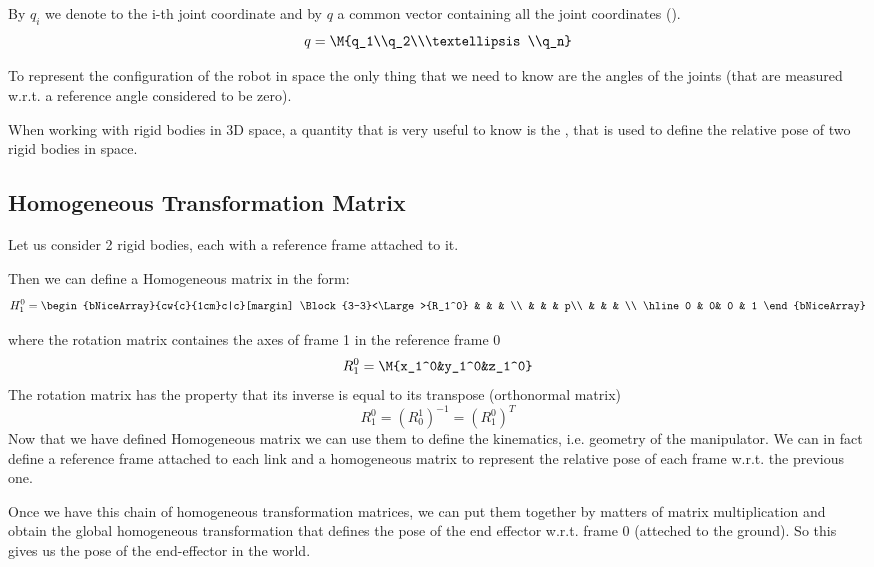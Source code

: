 By $q_i$ we denote to the i-th joint coordinate and by $q$ a common vector containing all the joint coordinates ().
\[
q = \M{q_1\\q_2\\\textellipsis\\q_n}
\]

To represent the configuration of the robot in space the only thing that we need to know are the angles of the joints (that are measured w.r.t. a reference angle considered to be zero).

When working with rigid bodies in 3D space, a quantity that is very useful to know is the , that is used to define the relative pose of two rigid bodies in space.

\subsection{Homogeneous Transformation Matrix}

Let us consider 2 rigid bodies, each with a reference frame attached to it.


Then we can define a Homogeneous matrix in the form:
\begin{equation*}
H_1^0 = 
\begin{bNiceArray}{cw{c}{1cm}c|c}[margin]
\Block{3-3}<\Large>{R_1^0} & & & \\
 & & & p\\
& & &  \\
\hline
0 & 0& 0 & 1
\end{bNiceArray}
\end{equation*}

where the rotation matrix containes the axes of frame 1 in the reference frame 0
\[R_1^0 = \M{x_1^0&y_1^0&z_1^0}\]
The rotation matrix has the property that its inverse is equal to its transpose (orthonormal matrix)
\[R_1^0 = (R_0^1)^{-1} = (R_1^0)^T\]
Now that we have defined Homogeneous matrix we can use them to define the kinematics, i.e. geometry of the manipulator.
We can in fact define a reference frame attached to each link and a homogeneous matrix to represent the relative pose of each frame w.r.t. the previous one.

Once we have this chain of homogeneous transformation matrices, we can put them together by matters of matrix multiplication and obtain the global homogeneous transformation that defines the pose of the end effector w.r.t. frame 0 (atteched to the ground). So this gives us the pose of the end-effector in the world.

